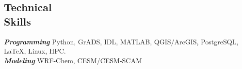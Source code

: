 \documentclass[margin,line]{resume}
\begin{document}
\begin{resume}
		
		
		\vspace{-0.4cm}
		\section{\mysidestyle \textbf{\textcolor{sep}{Technical \\Skills}}}
		
		\textbf{\emph{\textcolor{sep}{Programming}}} \hspace{1mm} Python, GrADS, IDL, MATLAB, QGIS/ArcGIS, PostgreSQL,  \LaTeX, Linux, HPC.\\
		\textbf{\emph{\textcolor{sep}{Modeling}}} \hspace{8mm} WRF-Chem, CESM/CESM-SCAM  
		
		

\end{resume}
\end{document}
